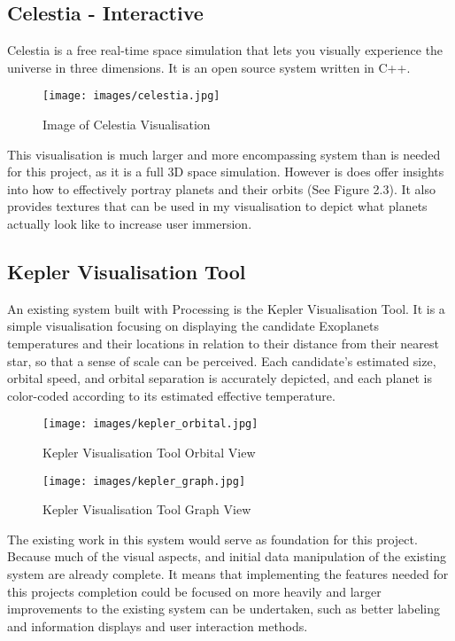 \documentclass[11pt
              , a4paper
              , twoside
              , openright
              ]{report}
\begin{document}
\subsection{Celestia - Interactive}
Celestia \cite{celestia} is a free real-time space simulation that lets you
visually experience the universe in three dimensions. It is an open source
system written in C++. 
\begin{figure}[h!]
  \centering
      \texttt{[image: images/celestia.jpg]}
  \caption{Image of Celestia Visualisation}
\end{figure}
This visualisation is much larger and more encompassing system than is needed
for this project, as it is a full 3D space simulation. However is does offer
insights into how to effectively portray planets and their orbits (See Figure
2.3). It also provides textures that can be used in my visualisation to depict
what planets actually look like to increase user immersion.

\subsection{Kepler Visualisation Tool}
An existing system built with Processing is the Kepler Visualisation
Tool\cite{kepler_github, kepler_article}. It is a simple visualisation focusing
on displaying the candidate Exoplanets temperatures and their locations in
relation to their distance from their nearest star, so that a sense of scale can
be perceived. Each candidate’s estimated size, orbital speed, and orbital
separation is accurately depicted, and each planet is color-coded according to
its estimated effective temperature.
\begin{figure}[h!]
  \centering
      \texttt{[image: images/kepler\_orbital.jpg]}
  \caption{Kepler Visualisation Tool Orbital View}
\end{figure}
\begin{figure}[h!]
  \centering
      \texttt{[image: images/kepler\_graph.jpg]}
  \caption{Kepler Visualisation Tool Graph View}
\end{figure}
The existing work in this system would serve as foundation for this project.
Because much of the visual aspects, and initial data manipulation of the
existing system are already complete. It means that implementing the features
needed for this projects completion could be focused on more heavily and larger
improvements to the existing system can be undertaken, such as better labeling
and information displays and user interaction methods.
\end{document}
